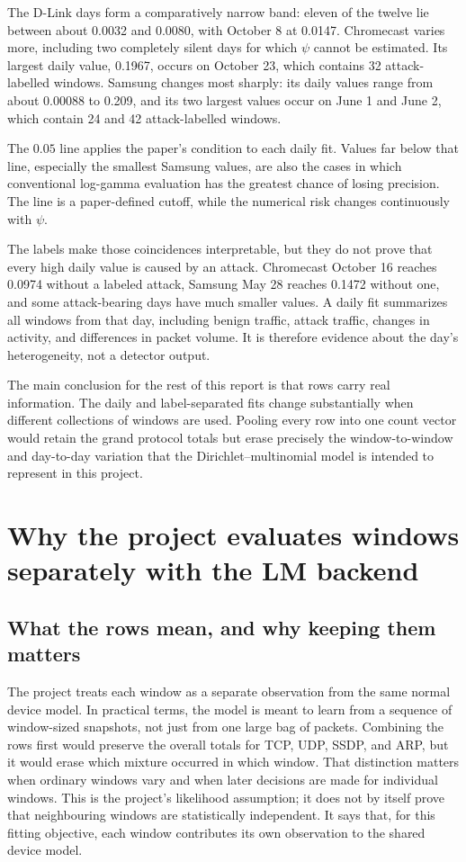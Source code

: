 \documentclass[11pt]{article}
\begin{document}
The D-Link days form a comparatively narrow band: eleven of the twelve lie
between about 0.0032 and 0.0080, with October 8 at 0.0147. Chromecast varies
more, including two completely silent days for which \(\psi\) cannot be
estimated. Its largest daily value, 0.1967, occurs on October 23, which
contains 32 attack-labelled windows. Samsung changes most sharply: its daily
values range from about 0.00088 to 0.209, and its two largest values occur on
June 1 and June 2, which contain 24 and 42 attack-labelled windows.

The \(0.05\) line applies the paper's condition to each daily fit. Values far
below that line, especially the smallest Samsung values, are also the cases in
which conventional log-gamma evaluation has the greatest chance of losing
precision. The line is a paper-defined cutoff, while the numerical risk changes
continuously with \(\psi\).

The labels make those coincidences interpretable, but they do not prove that
every high daily value is caused by an attack. Chromecast October 16 reaches
0.0974 without a labeled attack, Samsung May 28 reaches 0.1472 without one,
and some attack-bearing days have much smaller values. A daily fit summarizes
all windows from that day, including benign traffic, attack traffic, changes
in activity, and differences in packet volume. It is therefore evidence about
the day's heterogeneity, not a detector output.

The main conclusion for the rest of this report is that rows carry real
information. The daily and label-separated fits change substantially when
different collections of windows are used. Pooling every row into one count
vector would retain the grand protocol totals but erase precisely the
window-to-window and day-to-day variation that the Dirichlet--multinomial model
is intended to represent in this project.

\section{Why the project evaluates windows separately with the LM backend}
\label{sec:rowwise-backend}

\subsection{What the rows mean, and why keeping them matters}

The project treats each window as a separate observation from the same normal
device model. In practical terms, the model is meant to learn from a sequence of
window-sized snapshots, not just from one large bag of packets. Combining the
rows first would preserve the overall totals for TCP, UDP, SSDP, and ARP, but it
would erase which mixture occurred in which window. That distinction matters
when ordinary windows vary and when later decisions are made for individual
windows. This is the project's likelihood assumption; it does not by itself
prove that neighbouring windows are statistically independent. It says that,
for this fitting objective, each window contributes its own observation to the
shared device model.
\end{document}
